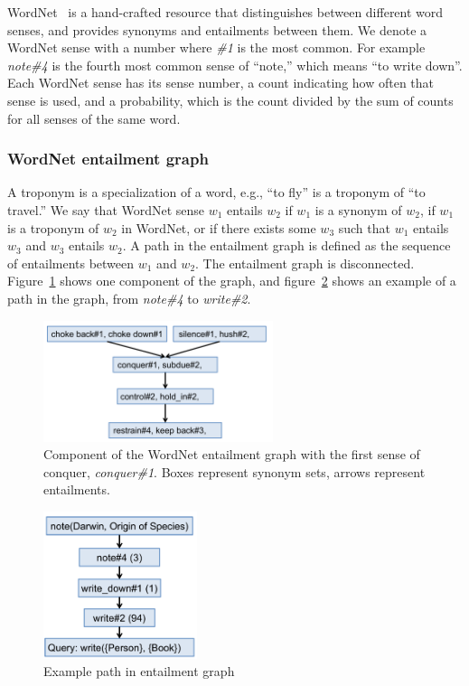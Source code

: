 \documentclass{article}
\begin{document}
WordNet~\cite{fellbaum98wordnet} is a hand-crafted resource that distinguishes between different word senses, and provides synonyms and entailments between them. We denote a WordNet sense with a number where \textit{\#1} is the most common. For example \textit{note\#4} is the fourth most common sense of ``note,'' which means ``to write down''. Each WordNet sense has its sense number, a count indicating how often that sense is used, and a probability, which is the count divided by the sum of counts for all senses of the same word.

\subsubsection{WordNet entailment graph}
A troponym is a specialization of a word, e.g., ``to fly'' is a troponym of ``to travel.'' We say that WordNet sense $w_1$ entails $w_2$ if $w_1$ is a synonym of $w_2$, if $w_1$ is a troponym of $w_2$ in WordNet, or if there exists some $w_3$ such that $w_1$ entails $w_3$ and $w_3$ entails $w_2$. A path in the entailment graph is defined as the sequence of entailments between $w_1$ and $w_2$. The entailment graph is disconnected. Figure~\ref{wordnet-graph} shows one component of the graph, and figure~\ref{example-path} shows an example of a path in the graph, from \textit{note\#4} to \textit{write\#2}.

\begin{figure}[h]
\begin{center}
\includegraphics[width=0.6\textwidth]{figures/wordnet-graph.pdf}
\end{center}
\caption{Component of the WordNet entailment graph with the first sense of conquer, \textit{conquer\#1}. Boxes represent synonym sets, arrows represent entailments.}\label{wordnet-graph}
\end{figure}

\begin{figure}[h]
\begin{center}
\includegraphics[width=0.4\textwidth]{figures/example-path.pdf}
\end{center}
\caption{Example path in entailment graph}\label{example-path}
\end{figure}
\end{document}
